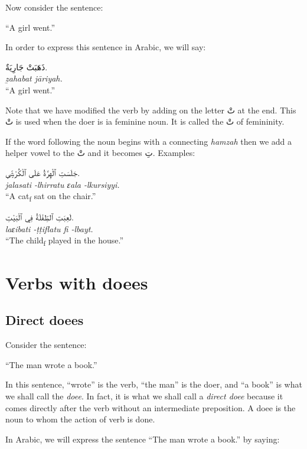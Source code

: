 \documentclass[
  10pt,
]{book}
\begin{document}
Now consider the sentence:

\enquote{A girl went.}

In order to express this sentence in Arabic, we will say:

\foreignlanguage{arabic}{ذَهَبَتْ جَارِيَةٌ.}\\
\emph{ẕahabat jāriyah.}\\
\enquote{A girl went.}

Note that we have modified the verb by adding on the letter \foreignlanguage{arabic}{تْ} at the end. This \foreignlanguage{arabic}{تْ} is used when the doer is ia feminine noun. It is called the \foreignlanguage{arabic}{تْ} of femininity.

If the word following the noun begins with a connecting \emph{hamzah} then we add a helper vowel to the \foreignlanguage{arabic}{تْ} and it becomes \foreignlanguage{arabic}{تِ}. Examples:

\foreignlanguage{arabic}{جَلَسَتِ ٱلْهِرَّةُ عَلَى ٱلْکُرْسِيِّ.}\\
\emph{jalasati -lhirratu ɛala -lkursiyyi.}\\
\enquote{A cat\textsubscript{f} sat on the chair.}

\foreignlanguage{arabic}{لَعِبَتِ ٱلطِّفْلَةُ فِي ٱلْبَيْتِ.}\\
\emph{laɛibati -ṭṭiflatu fi -lbayt.}\\
\enquote{The child\textsubscript{f} played in the house.}

\section{Verbs with doees}\label{verbs-with-doees}

\subsection{Direct doees}\label{direct-doees}

Consider the sentence:

\enquote{The man wrote a book.}

In this sentence, \enquote{wrote} is the verb, \enquote{the man} is the doer, and \enquote{a book} is what we shall call the \emph{doee}. In fact, it is what we shall call a \emph{direct doee} because it comes directly after the verb without an intermediate preposition. A doee is the noun to whom the action of verb is done.

In Arabic, we will express the sentence \enquote{The man wrote a book.} by saying:
\end{document}
